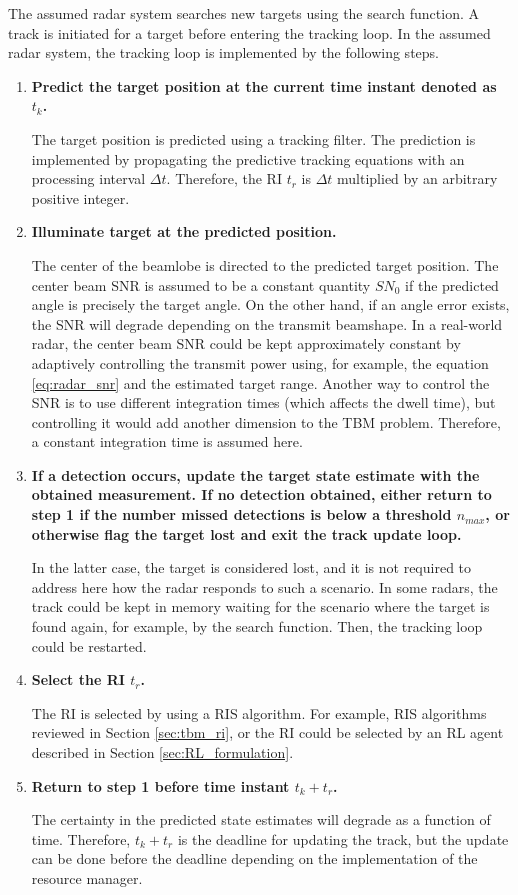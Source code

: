 \documentclass[english, 12pt, a4paper, elec, utf8, a-1b, online]{aaltothesis}
\newcommand{\dt}{\Delta t}
\newcommand{\ri}{t_r}
\begin{document}
The assumed radar system searches new targets using the search function. 
A track is initiated for a target before entering the tracking loop. 
In the assumed radar system, the tracking loop is implemented by the following steps.
\begin{enumerate}
\item\textbf{Predict the target position at the current time instant denoted as $t_k$.}

The target position is predicted using a tracking filter. The prediction is implemented by propagating the predictive tracking equations with an processing interval $\dt$. 
Therefore, the RI $t_r$ is $\dt$ multiplied by an arbitrary positive integer.

\item\textbf{Illuminate target at the predicted position.}

The center of the beamlobe is directed to the predicted target position. 
The center beam SNR is assumed to be a constant quantity $SN_0$ if the predicted angle is precisely the target angle. 
On the other hand, if an angle error exists, the SNR will degrade depending on the transmit beamshape. 
In a real-world radar, the center beam SNR could be kept approximately constant by adaptively controlling the transmit power using, for example, the equation \eqref{eq:radar_snr} and the estimated target range. 
Another way to control the SNR is to use different integration times (which affects the dwell time), but controlling it would add another dimension to the TBM problem. 
Therefore, a constant integration time is assumed here.

\item\textbf{If a detection occurs, update the target state estimate with the obtained measurement. If no detection obtained, either return to step 1 if the number missed detections is below a threshold $n_{max}$, or otherwise flag the target lost and exit the track update loop.}

In the latter case, the target is considered lost, and it is not required to address here how the radar responds to such a scenario. 
In some radars, the track could be kept in memory waiting for the scenario where the target is found again, for example, by the search function. 
Then, the tracking loop could be restarted.


\item\textbf{Select the RI $\ri$.}

The RI is selected by using a RIS algorithm.
For example, RIS algorithms reviewed in Section \ref{sec:tbm_ri}, or the RI could be selected by an RL agent described in Section \ref{sec:RL_formulation}.

\item\textbf{Return to step 1 before time instant $t_k + \ri$.}

The certainty in the predicted state estimates will degrade as a function of time. Therefore, $t_k + \ri$ is the deadline for updating the track, but the update can be done before the deadline depending on the implementation of the resource manager.

\end{enumerate}
\end{document}
